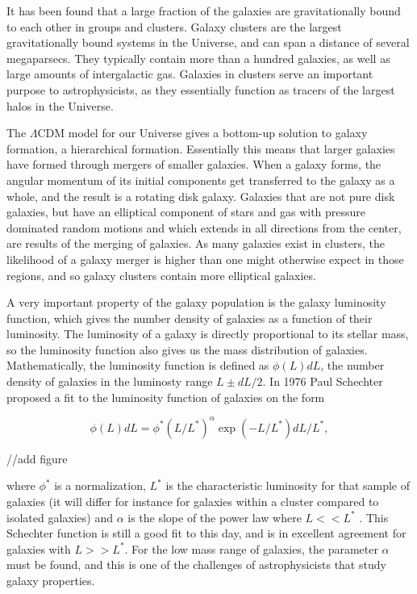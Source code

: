 It has been found that a large fraction of the galaxies are gravitationally bound to each other in groups and clusters. %
Galaxy clusters are the largest gravitationally bound systems in the Universe, and can span a distance of several megaparsecs. They typically contain more than a hundred galaxies, as well as large amounts of intergalactic gas. Galaxies in clusters serve an important purpose to astrophysicists, as they essentially function as tracers of the largest halos in the Universe.

The $\Lambda$CDM model for our Universe gives a bottom-up solution to galaxy formation, a hierarchical formation. Essentially this means that larger galaxies have formed through mergers of smaller galaxies. When a galaxy forms, the angular momentum of its initial components get transferred to the galaxy as a whole, and the result is a rotating disk galaxy. Galaxies that are not pure disk galaxies, but have an elliptical component of stars and gas with pressure dominated random motions and which extends in all directions from the center, are results of the merging of galaxies. As many galaxies exist in clusters, the likelihood of a galaxy merger is higher than one might otherwise expect in those regions, and so galaxy clusters contain more elliptical galaxies.

A very important property of the galaxy population is the galaxy luminosity function, which gives the number density of galaxies as a function of their luminosity. The luminosity of a galaxy is directly proportional to its stellar mass, so the luminosity function also gives us the mass distribution of galaxies. Mathematically, the luminosity function is defined as $\phi(L)dL$, the number density of galaxies in the luminosty range $L \pm dL/2$. In 1976 Paul Schechter proposed a fit to the luminosity function of galaxies on the form

\begin{equation}
    \phi(L)dL = \phi^*(L/L^*)^{\alpha}\exp{(-L/L^*)}dL/L^*,
\end{equation}

//add figure

where $\phi^*$ is a normalization, $L^*$ is the characteristic luminosity for that sample of galaxies (it will differ for instance for galaxies within a cluster compared to isolated galaxies) and $\alpha$ is the slope of the power law where $L<<L^*$ \parencite{Schechter1976}. This Schechter function is still a good fit to this day, and is in excellent agreement for galaxies with $L>>L^*$. For the low mass range of galaxies, the parameter $\alpha$ must be found, and this is one of the challenges of astrophysicists that study galaxy properties.


